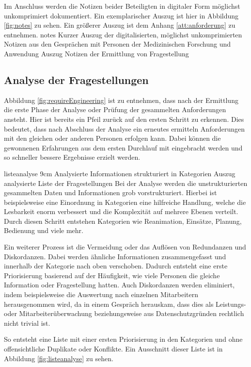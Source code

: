 Im Anschluss werden die Notizen beider Beteiligten in digitaler Form möglichst unkomprimiert dokumentiert.
Ein exemplarischer Auszug ist hier in Abbildung \ref{fig:notes} zu sehen. 
Ein größerer Auszug ist dem Anhang \ref{att:anforderung} zu entnehmen.
\bildbreit
{notes}
{Kurzer Auszug der digitalisierten, möglichst unkomprimierten Notizen aus den Gesprächen mit Personen der \glqq Medizinischen Forschung und Anwendung\grqq}
{Auszug Notizen der Ermittlung von Fragestellung}



\subsection{Analyse der Fragestellungen}
\label{sub:analyseFragen}
Abbildung \ref{fig:requireEngineering} ist zu entnehmen, dass nach der Ermittlung die erste Phase der Analyse oder Prüfung der gesammelten Anforderungen ansteht.
Hier ist bereits ein Pfeil zurück auf den ersten Schritt zu erkennen.
Dies bedeutet, dass nach Abschluss der Analyse ein erneutes ermitteln Anforderungen mit den gleichen oder anderen Personen erfolgen kann.
Dabei können die gewonnenen Erfahrungen aus dem ersten Durchlauf mit eingebracht werden und so schneller bessere Ergebnisse erzielt werden.

\bild
{listeanalyse}
{9cm}
{Analysierte Informationen strukturiert in Kategorien}
{Auszug analysierte Liste der Fragestellungen}
Bei der Analyse werden die unstrukturierten gesammelten Daten und Informationen grob vorstrukturiert.
Hierbei ist beispielsweise eine Einordnung in Kategorien eine hilfreiche Handlung, welche die Lesbarkeit enorm verbessert und die Komplexität auf mehrere Ebenen verteilt.
Durch diesen Schritt entstehen Kategorien wie Reanimation, Einsätze, Planung, Bedienung und viele mehr.

Ein weiterer Prozess ist die Vermeidung oder das Auflösen von Redundanzen und Diskordanzen.
Dabei werden ähnliche Informationen zusammengefasst und innerhalb der Kategorie nach oben verschoben.
Dadurch entsteht eine erste Priorisierung basierend auf der Häufigkeit, wie viele Personen die gleiche Information oder Fragestellung hatten.
Auch Diskordanzen werden eliminiert, indem beispielsweise die Auswertung nach einzelnen Mitarbeitern herausgenommen wird, da in einem Gespräch herauskam, dass dies als Leistungs- oder Mitarbeiterüberwachung beziehungsweise aus Datenschutzgründen rechtlich nicht trivial ist.

So entsteht eine Liste mit einer ersten Priorisierung in den Kategorien und ohne offensichtliche Duplikate oder Konflikte.
Ein Ausschnitt dieser Liste ist in Abbildung \ref{fig:listeanalyse} zu sehen.
\clearpage
